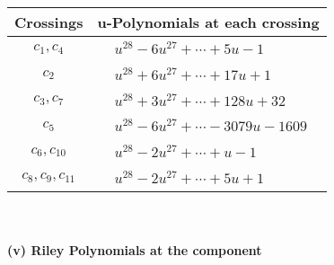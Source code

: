 \documentclass[1p]{elsarticle_modified}
\theoremstyle{definition}
\begin{document}
\begin{tabular}{m{50pt}|m{274pt}}
Crossings & \hspace{64pt}u-Polynomials at each crossing \\
\hline $$\begin{aligned}c_{1},c_{4}\end{aligned}$$&$\begin{aligned}
&u^{28}-6 u^{27}+\cdots+5 u-1
\end{aligned}$\\
\hline $$\begin{aligned}c_{2}\end{aligned}$$&$\begin{aligned}
&u^{28}+6 u^{27}+\cdots+17 u+1
\end{aligned}$\\
\hline $$\begin{aligned}c_{3},c_{7}\end{aligned}$$&$\begin{aligned}
&u^{28}+3 u^{27}+\cdots+128 u+32
\end{aligned}$\\
\hline $$\begin{aligned}c_{5}\end{aligned}$$&$\begin{aligned}
&u^{28}-6 u^{27}+\cdots-3079 u-1609
\end{aligned}$\\
\hline $$\begin{aligned}c_{6},c_{10}\end{aligned}$$&$\begin{aligned}
&u^{28}-2 u^{27}+\cdots+u-1
\end{aligned}$\\
\hline $$\begin{aligned}c_{8},c_{9},c_{11}\end{aligned}$$&$\begin{aligned}
&u^{28}-2 u^{27}+\cdots+5 u+1
\end{aligned}$\\
\hline
\end{tabular}\\~\\
\newpage\renewcommand{\arraystretch}{1}
\flushleft \textbf{(v) Riley Polynomials at the component}\newline \\
\end{document}

